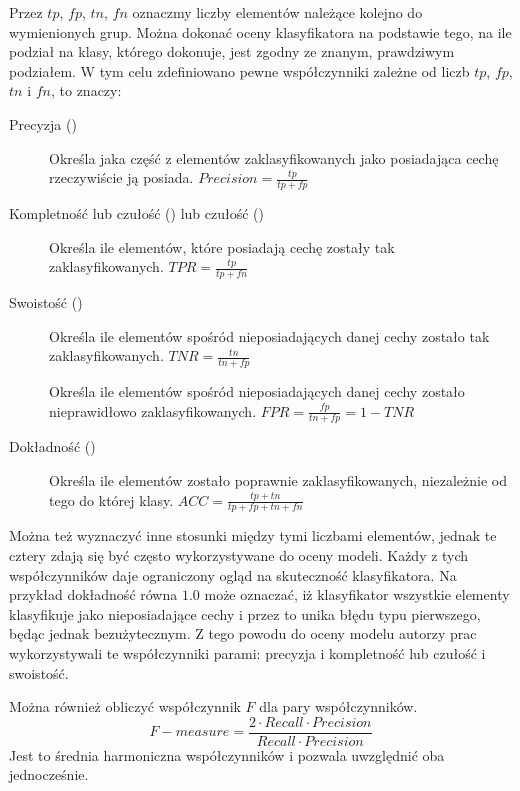 Przez $tp$, $fp$, $tn$, $fn$ oznaczmy liczby elementów należące kolejno do wymienionych grup.
Można dokonać oceny klasyfikatora na podstawie tego, na ile podział na klasy, którego dokonuje,
jest zgodny ze znanym, prawdziwym podziałem. W tym celu zdefiniowano pewne współczynniki zależne
od liczb $tp$, $fp$, $tn$ i $fn$, to znaczy:

\begin{description}
    \item[Precyzja ()] Określa jaka część z elementów zaklasyfikowanych jako posiadająca cechę rzeczywiście ją posiada. $\mathit{Precision} = \frac{tp}{tp + fp}$
    \item[Kompletność lub czułość () lub czułość ()]
        Określa ile elementów, które posiadają cechę zostały tak zaklasyfikowanych. $\mathit{TPR} = \frac{tp}{tp + fn}$
    \item[Swoistość ()] Określa ile elementów spośród
        nieposiadających danej cechy zostało tak zaklasyfikowanych. $\mathit{TNR} = \frac{tn}{tn + fp}$
    \item[] Określa ile elementów spośród
        nieposiadających danej cechy zostało nieprawidłowo zaklasyfikowanych. $\mathit{FPR} = \frac{fp}{tn + fp} = 1 - \mathit{TNR}$
    \item[Dokładność ()] Określa ile elementów zostało poprawnie zaklasyfikowanych,
        niezależnie od tego do której klasy. $\mathit{ACC} = \frac{tp + tn}{tp + fp + tn + fn}$
\end{description}

Można też wyznaczyć inne stosunki między tymi liczbami elementów,
jednak te cztery zdają się być często wykorzystywane do oceny modeli.
Każdy z tych współczynników daje ograniczony ogląd na skuteczność
klasyfikatora. Na przykład dokładność równa $1.0$ może oznaczać,
iż klasyfikator wszystkie elementy klasyfikuje jako nieposiadające
cechy i przez to unika błędu typu pierwszego, będąc jednak bezużytecznym.
Z tego powodu do oceny modelu autorzy prac wykorzystywali te
współczynniki parami: precyzja i kompletność lub czułość i swoistość.

Można również obliczyć współczynnik $F$ dla pary współczynników.
$$\mathit{F{-}measure} = \frac{2 \cdot Recall \cdot Precision}{Recall \cdot Precision}$$
Jest to średnia harmoniczna współczynników i pozwala uwzględnić oba jednocześnie.

